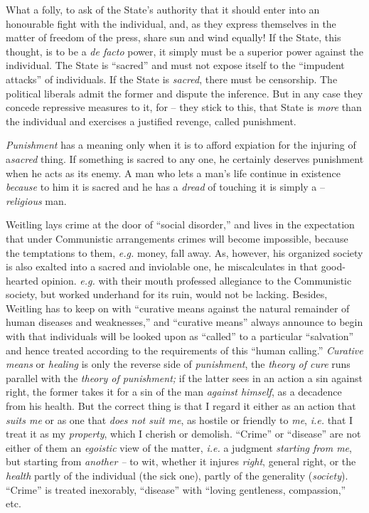 What a folly, to ask of the State's authority that it should enter into an 
honourable fight with the individual, and, as they express themselves in the 
matter of freedom of the press, share sun and wind equally! If the State, this 
thought, is to be a \textit{de facto} power, it simply must be a superior 
power against the individual. The State is ``sacred'' and must not expose 
itself to the ``impudent attacks'' of individuals. If the State is 
\textit{sacred}, there must be censorship. The political liberals admit the 
former and dispute the inference. But in any case they concede repressive 
measures to it, for -- they stick to this, that State is \textit{more} than 
the individual and exercises a justified revenge, called punishment.

\textit{Punishment} has a meaning only when it is to afford expiation for the 
injuring of a\textit{sacred} thing. If something is sacred to any one, he 
certainly deserves punishment when he acts as its enemy. A man who lets a 
man's life continue in existence \textit{because} to him it is sacred and he 
has a \textit{dread} of touching it is simply a -- \textit{religious} man.

Weitling lays crime at the door of ``social disorder,'' and lives in the 
expectation that under Communistic arrangements crimes will become impossible, 
because the temptations to them, \textit{e.g.} money, fall away. As, however, 
his organized society is also exalted into a sacred and inviolable one, he 
miscalculates in that good-hearted opinion. \textit{e.g.} with their mouth 
professed allegiance to the Communistic society, but worked underhand for its 
ruin, would not be lacking. Besides, Weitling has to keep on with ``curative 
means against the natural remainder of human diseases and weaknesses,'' and 
``curative means'' always announce to begin with that individuals will be 
looked upon as ``called'' to a particular ``salvation'' and hence treated 
according to the requirements of this ``human calling.'' \textit{Curative 
means} or \textit{healing} is only the reverse side of \textit{punishment}, 
the \textit{theory of cure} runs parallel with the \textit{theory of 
punishment;} if the latter sees in an action a sin against right, the former 
takes it for a sin of the man \textit{against himself}, as a decadence from 
his health. But the correct thing is that I regard it either as an action that 
\textit{suits me} or as one that \textit{does not suit me}, as hostile or 
friendly to \textit{me}, \textit{i.e.} that I treat it as my 
\textit{property}, which I cherish or demolish. ``Crime'' or ``disease'' 
are not either of them an \textit{egoistic} view of the matter, \textit{i.e.} 
a judgment \textit{starting from me}, but starting from \textit{another --} to 
wit, whether it injures \textit{right}, general right, or the \textit{health} 
partly of the individual (the sick one), partly of the generality 
(\textit{society}). ``Crime'' is treated inexorably, ``disease'' with 
``loving gentleness, compassion,'' etc.

